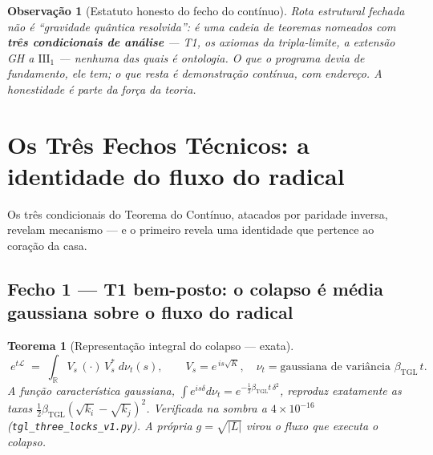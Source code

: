 \documentclass[11pt,a4paper]{article}
\newcommand{\bTGL}{\beta_{\mathrm{TGL}}}
\newtheorem{theorem}{Teorema}
\newtheorem{remark}{Observação}
\begin{document}
\begin{remark}[Estatuto honesto do fecho do contínuo]
\emph{Rota estrutural fechada} não é ``gravidade quântica resolvida'':
é uma cadeia de teoremas nomeados com \textbf{três condicionais de
análise} --- T1, os axiomas da tripla-limite, a extensão GH a
$\mathrm{III}_1$ --- nenhuma das quais é ontologia. O que o programa
devia de fundamento, ele tem; o que resta é demonstração contínua, com
endereço. A honestidade é parte da força da teoria.
\end{remark}

\section{Os Três Fechos Técnicos: a identidade do fluxo do radical}
\label{sec:tresfechos}
Os três condicionais do Teorema do Contínuo, atacados por paridade
inversa, revelam mecanismo --- e o primeiro revela uma identidade que
pertence ao coração da casa.

\subsection{Fecho 1 --- T1 bem-posto: o colapso é média gaussiana sobre
o fluxo do radical}
\begin{theorem}[Representação integral do colapso --- exata]
\label{thm:radicalflow}
\begin{equation}
\boxed{\;e^{t\mathcal L}\;=\;\int_{\mathbb R}V_s\,(\cdot)\,V_s^{*}\;
d\nu_t(s),\qquad V_s=e^{\,i s\sqrt{K}},\quad
\nu_t=\text{gaussiana de variância }\bTGL\,t.\;}
\end{equation}
A função característica gaussiana,
$\int e^{is\delta}d\nu_t=e^{-\frac12\bTGL t\,\delta^2}$, reproduz
\emph{exatamente} as taxas
$\tfrac12\bTGL(\sqrt{k_i}-\sqrt{k_j})^2$. Verificada na sombra a
$4\times10^{-16}$ (\texttt{tgl\_three\_locks\_v1.py}).
\emph{A própria $g=\sqrt{|L|}$ virou o fluxo que executa o colapso.}
\end{theorem}
\end{document}
